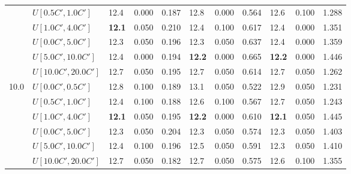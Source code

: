 \begin{table}[h]
{\begin{tabular}{|l|l||l|l|l||l|l|l||l|l|l|}
       & $U[0.5C',1.0C']$ & 12.4 & 0.000 & 0.187 & 12.8 & 0.000 & 0.564 & 12.6 & 0.100 & 1.288 \\
       & $U[1.0C',4.0C']$ & \textbf{12.1} & 0.050 & 0.210 & 12.4 & 0.100 & 0.617 & 12.4 & 0.000 & 1.351 \\
       & $U[0.0C',5.0C']$ & 12.3 & 0.050 & 0.196 & 12.3 & 0.050 & 0.637 & 12.4 & 0.000 & 1.359 \\
       & $U[5.0C',10.0C']$ & 12.4 & 0.000 & 0.194 & \textbf{12.2} & 0.000 & 0.665 & \textbf{12.2} & 0.000 & 1.446 \\
       & $U[10.0C',20.0C']$ & 12.7 & 0.050 & 0.195 & 12.7 & 0.050 & 0.614 & 12.7 & 0.050 & 1.262 \\
      \hline\hline
      \multirow{6}{*}{10.0} & $U[0.0C',0.5C']$ & 12.8 & 0.100 & 0.189 & 13.1 & 0.050 & 0.522 & 12.9 & 0.050 & 1.231 \\
       & $U[0.5C',1.0C']$ & 12.4 & 0.100 & 0.188 & 12.6 & 0.100 & 0.567 & 12.7 & 0.050 & 1.243 \\
       & $U[1.0C',4.0C']$ & \textbf{12.1} & 0.050 & 0.195 & \textbf{12.2} & 0.000 & 0.610 & \textbf{12.1} & 0.050 & 1.445 \\
       & $U[0.0C',5.0C']$ & 12.3 & 0.050 & 0.204 & 12.3 & 0.050 & 0.574 & 12.3 & 0.050 & 1.403 \\
       & $U[5.0C',10.0C']$ & 12.4 & 0.100 & 0.196 & 12.5 & 0.050 & 0.591 & 12.3 & 0.050 & 1.410 \\
       & $U[10.0C',20.0C']$ & 12.7 & 0.050 & 0.182 & 12.7 & 0.050 & 0.575 & 12.6 & 0.100 & 1.355 \\
      \hline
      \end{tabular}
      }
      \label{tab:pcpn90p8RecoloredTT}
      \end{table}
      

